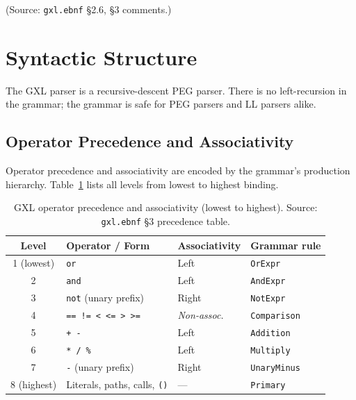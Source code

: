 (Source: \texttt{gxl.ebnf} \S2.6, \S3 comments.)

\section{Syntactic Structure}
\label{sec:gxl:syntactic}

The GXL parser is a recursive-descent PEG parser.
There is no left-recursion in the grammar; the grammar is safe for PEG parsers
and LL parsers alike.

\subsection{Operator Precedence and Associativity}
\label{subsec:gxl:precedence}

Operator precedence and associativity are encoded by the grammar's production
hierarchy.
Table~\ref{tab:gxl-precedence} lists all levels from lowest to highest binding.

\begin{table}[ht]
\centering
\begin{tabular}{clll}
\hline
\textbf{Level} & \textbf{Operator / Form} & \textbf{Associativity} & \textbf{Grammar rule} \\
\hline
1 (lowest) & \texttt{or}                        & Left  & \texttt{OrExpr}    \\
2          & \texttt{and}                       & Left  & \texttt{AndExpr}   \\
3          & \texttt{not} (unary prefix)        & Right & \texttt{NotExpr}   \\
4          & \texttt{==}~\texttt{!=}~\texttt{<}~\texttt{<=}~\texttt{>}~\texttt{>=}
                                                & \emph{Non-assoc.} & \texttt{Comparison} \\
5          & \texttt{+}~\texttt{-}              & Left  & \texttt{Addition}  \\
6          & \texttt{*}~\texttt{/}~\texttt{\%}  & Left  & \texttt{Multiply}  \\
7          & \texttt{-} (unary prefix)          & Right & \texttt{UnaryMinus} \\
8 (highest) & Literals, paths, calls, \texttt{()} & ---  & \texttt{Primary}   \\
\hline
\end{tabular}
\caption{GXL operator precedence and associativity (lowest to highest).
  Source: \texttt{gxl.ebnf} \S3 precedence table.}
\label{tab:gxl-precedence}
\end{table}


